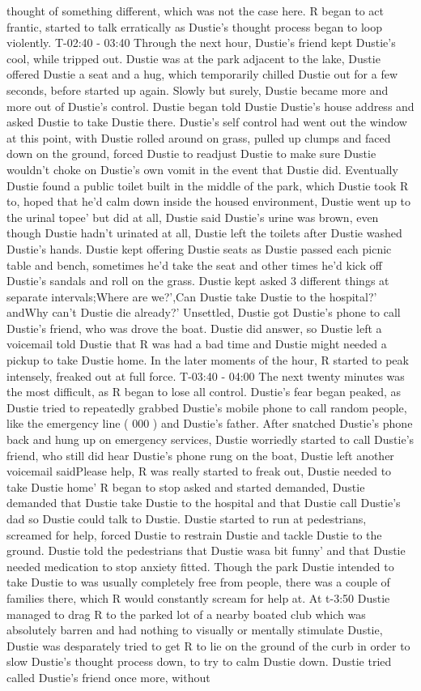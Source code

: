 \documentclass[12pt]{book}
\begin{document}
thought of something different, which was not the case here. R began to act frantic, started to talk erratically as Dustie's thought process began to loop violently. T-02:40 - 03:40 Through the next hour, Dustie's friend kept Dustie's cool, while tripped out. Dustie was at the park adjacent to the lake, Dustie offered Dustie a seat and a hug, which temporarily chilled Dustie out for a few seconds, before started up again. Slowly but surely, Dustie became more and more out of Dustie's control. Dustie began told Dustie Dustie's house address and asked Dustie to take Dustie there. Dustie's self control had went out the window at this point, with Dustie rolled around on grass, pulled up clumps and faced down on the ground, forced Dustie to readjust Dustie to make sure Dustie wouldn't choke on Dustie's own vomit in the event that Dustie did. Eventually Dustie found a public toilet built in the middle of the park, which Dustie took R to, hoped that he'd calm down inside the housed environment, Dustie went up to the urinal topee' but did at all, Dustie said Dustie's urine was brown, even though Dustie hadn't urinated at all, Dustie left the toilets after Dustie washed Dustie's hands. Dustie kept offering Dustie seats as Dustie passed each picnic table and bench, sometimes he'd take the seat and other times he'd kick off Dustie's sandals and roll on the grass. Dustie kept asked 3 different things at separate intervals;Where are we?',Can Dustie take Dustie to the hospital?' andWhy can't Dustie die already?' Unsettled, Dustie got Dustie's phone to call Dustie's friend, who was drove the boat. Dustie did answer, so Dustie left a voicemail told Dustie that R was had a bad time and Dustie might needed a pickup to take Dustie home. In the later moments of the hour, R started to peak intensely, freaked out at full force. T-03:40 - 04:00 The next twenty minutes was the most difficult, as R began to lose all control. Dustie's fear began peaked, as Dustie tried to repeatedly grabbed Dustie's mobile phone to call random people, like the emergency line ( 000 ) and Dustie's father. After snatched Dustie's phone back and hung up on emergency services, Dustie worriedly started to call Dustie's friend, who still did hear Dustie's phone rung on the boat, Dustie left another voicemail saidPlease help, R was really started to freak out, Dustie needed to take Dustie home' R began to stop asked and started demanded, Dustie demanded that Dustie take Dustie to the hospital and that Dustie call Dustie's dad so Dustie could talk to Dustie. Dustie started to run at pedestrians, screamed for help, forced Dustie to restrain Dustie and tackle Dustie to the ground. Dustie told the pedestrians that Dustie wasa bit funny' and that Dustie needed medication to stop anxiety fitted. Though the park Dustie intended to take Dustie to was usually completely free from people, there was a couple of families there, which R would constantly scream for help at. At t-3:50 Dustie managed to drag R to the parked lot of a nearby boated club which was absolutely barren and had nothing to visually or mentally stimulate Dustie, Dustie was desparately tried to get R to lie on the ground of the curb in order to slow Dustie's thought process down, to try to calm Dustie down. Dustie tried called Dustie's friend once more, without 
\end{document}

